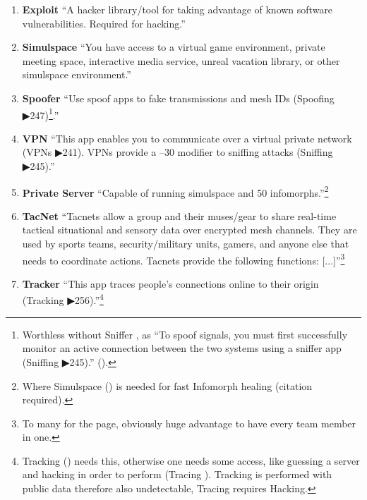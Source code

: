 \begin{enumerate}
    \item \textbf{\gls{Exploit}} “A hacker library/tool for taking advantage of known software vulnerabilities. Required for hacking.” \citep[pg. 326]{ep2e_1.1_2019}

    \item \textbf{\gls{Simulspace}} “You have access to a virtual game environment, private meeting space, interactive media service, unreal vacation library, or other simulspace environment.” \citep[pg. 315]{ep2e_1.1_2019}

    \item \textbf{\gls{Spoofer}} “Use spoof apps to fake transmissions and mesh IDs (Spoofing ▶247)\footnote{Worthless without Sniffer \citep[pg. 326]{ep2e_1.1_2019}, as “To spoof signals, you must first successfully monitor an active connection between the two systems using a sniffer app (Sniffing ▶245).” (\citep[pg. 247]{ep2e_1.1_2019}).}.” \citep[pg. 326]{ep2e_1.1_2019}

    \item \textbf{\gls{VPN}} “This app enables you to communicate over a virtual private network (VPNs ▶241). VPNs provide a –30 modifier to sniffing attacks (Sniffing ▶245).” \citep[pg. 326]{ep2e_1.1_2019}

    \item \textbf{\gls{Private Server}} “Capable of running simulspace and 50 infomorphs.”\footnote{Where Simulspace (\citep[pg. 315]{ep2e_1.1_2019}) is needed for fast Infomorph healing (citation required).} \citep[pg. 315]{ep2e_1.1_2019}

    \item \textbf{\gls{TacNet}} “Tacnets allow a group and their muses/gear to share real-time tactical situational and sensory data over encrypted mesh channels. They are used by sports teams, security/military units, gamers, and anyone else that needs to coordinate actions. Tacnets provide the following functions: [...]”\footnote{To many for the page, obviously huge advantage to have every team member in one.} \citep[pg. 327]{ep2e_1.1_2019}

    \item \textbf{\gls{Tracker}} “This app traces people’s connections online to their origin (Tracking ▶256).”\footnote{Tracking (\citep[pg. 256]{ep2e_1.1_2019}) needs this, otherwise one needs some access, like guessing a server and hacking in order to perform (Tracing \citep[pg. 249]{ep2e_1.1_2019}). Tracking is performed with public data therefore also undetectable, Tracing requires Hacking.} \citep[pg. 326]{ep2e_1.1_2019}


\end{enumerate}
